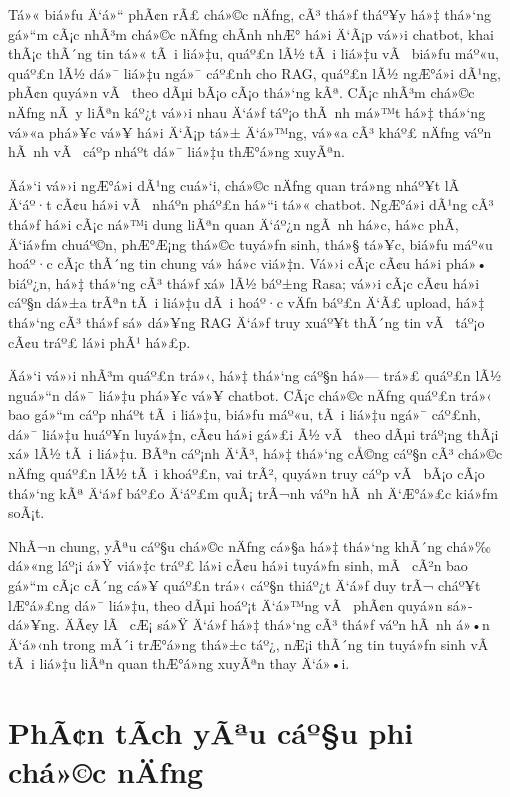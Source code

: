 ﻿\documentclass[12pt,a4paper]{report}
\begin{document}
Tá»« biá»ƒu Ä‘á»“ phÃ¢n rÃ£ chá»©c nÄƒng, cÃ³ thá»ƒ tháº¥y há»‡ thá»‘ng gá»“m cÃ¡c nhÃ³m chá»©c nÄƒng chÃ­nh nhÆ° há»i Ä‘Ã¡p vá»›i chatbot, khai thÃ¡c thÃ´ng tin tá»« tÃ i liá»‡u, quáº£n lÃ½ tÃ i liá»‡u vÃ  biá»ƒu máº«u, quáº£n lÃ½ dá»¯ liá»‡u ngá»¯ cáº£nh cho RAG, quáº£n lÃ½ ngÆ°á»i dÃ¹ng, phÃ¢n quyá»n vÃ  theo dÃµi bÃ¡o cÃ¡o thá»‘ng kÃª. CÃ¡c nhÃ³m chá»©c nÄƒng nÃ y liÃªn káº¿t vá»›i nhau Ä‘á»ƒ táº¡o thÃ nh má»™t há»‡ thá»‘ng vá»«a phá»¥c vá»¥ há»i Ä‘Ã¡p tá»± Ä‘á»™ng, vá»«a cÃ³ kháº£ nÄƒng váº­n hÃ nh vÃ  cáº­p nháº­t dá»¯ liá»‡u thÆ°á»ng xuyÃªn.

Äá»‘i vá»›i ngÆ°á»i dÃ¹ng cuá»‘i, chá»©c nÄƒng quan trá»ng nháº¥t lÃ  Ä‘áº·t cÃ¢u há»i vÃ  nháº­n pháº£n há»“i tá»« chatbot. NgÆ°á»i dÃ¹ng cÃ³ thá»ƒ há»i cÃ¡c ná»™i dung liÃªn quan Ä‘áº¿n ngÃ nh há»c, há»c phÃ­, Ä‘iá»ƒm chuáº©n, phÆ°Æ¡ng thá»©c tuyá»ƒn sinh, thá»§ tá»¥c, biá»ƒu máº«u hoáº·c cÃ¡c thÃ´ng tin chung vá» há»c viá»‡n. Vá»›i cÃ¡c cÃ¢u há»i phá»• biáº¿n, há»‡ thá»‘ng cÃ³ thá»ƒ xá»­ lÃ½ báº±ng Rasa; vá»›i cÃ¡c cÃ¢u há»i cáº§n dá»±a trÃªn tÃ i liá»‡u dÃ i hoáº·c vÄƒn báº£n Ä‘Ã£ upload, há»‡ thá»‘ng cÃ³ thá»ƒ sá»­ dá»¥ng RAG Ä‘á»ƒ truy xuáº¥t thÃ´ng tin vÃ  táº¡o cÃ¢u tráº£ lá»i phÃ¹ há»£p.

Äá»‘i vá»›i nhÃ³m quáº£n trá»‹, há»‡ thá»‘ng cáº§n há»— trá»£ quáº£n lÃ½ nguá»“n dá»¯ liá»‡u phá»¥c vá»¥ chatbot. CÃ¡c chá»©c nÄƒng quáº£n trá»‹ bao gá»“m cáº­p nháº­t tÃ i liá»‡u, biá»ƒu máº«u, tÃ i liá»‡u ngá»¯ cáº£nh, dá»¯ liá»‡u huáº¥n luyá»‡n, cÃ¢u há»i gá»£i Ã½ vÃ  theo dÃµi tráº¡ng thÃ¡i xá»­ lÃ½ tÃ i liá»‡u. BÃªn cáº¡nh Ä‘Ã³, há»‡ thá»‘ng cÅ©ng cáº§n cÃ³ chá»©c nÄƒng quáº£n lÃ½ tÃ i khoáº£n, vai trÃ², quyá»n truy cáº­p vÃ  bÃ¡o cÃ¡o thá»‘ng kÃª Ä‘á»ƒ báº£o Ä‘áº£m quÃ¡ trÃ¬nh váº­n hÃ nh Ä‘Æ°á»£c kiá»ƒm soÃ¡t.

NhÃ¬n chung, yÃªu cáº§u chá»©c nÄƒng cá»§a há»‡ thá»‘ng khÃ´ng chá»‰ dá»«ng láº¡i á»Ÿ viá»‡c tráº£ lá»i cÃ¢u há»i tuyá»ƒn sinh, mÃ  cÃ²n bao gá»“m cÃ¡c cÃ´ng cá»¥ quáº£n trá»‹ cáº§n thiáº¿t Ä‘á»ƒ duy trÃ¬ cháº¥t lÆ°á»£ng dá»¯ liá»‡u, theo dÃµi hoáº¡t Ä‘á»™ng vÃ  phÃ¢n quyá»n sá»­ dá»¥ng. ÄÃ¢y lÃ  cÆ¡ sá»Ÿ Ä‘á»ƒ há»‡ thá»‘ng cÃ³ thá»ƒ váº­n hÃ nh á»•n Ä‘á»‹nh trong mÃ´i trÆ°á»ng thá»±c táº¿, nÆ¡i thÃ´ng tin tuyá»ƒn sinh vÃ  tÃ i liá»‡u liÃªn quan thÆ°á»ng xuyÃªn thay Ä‘á»•i.



\section{PhÃ¢n tÃ­ch yÃªu cáº§u phi chá»©c nÄƒng}
\end{document}
